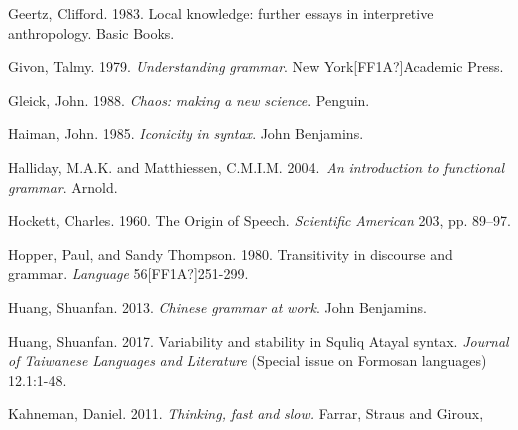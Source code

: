 \begin{stylereferences}
Geertz, Clifford. 1983. Local knowledge: further essays in interpretive anthropology. Basic Books.  ~
\end{stylereferences}

\begin{stylereferences}
Givon, Talmy. 1979. \textit{Understanding} \textit{grammar}. New York[FF1A?]Academic Press.
\end{stylereferences}

\begin{stylereferences}
Gleick, John. 1988. \textit{Chaos:} \textit{making} \textit{a} \textit{new} \textit{science}. Penguin.
\end{stylereferences}

\begin{stylereferences}
Haiman, John. 1985. \textit{Iconicity} \textit{in} \textit{syntax}. John Benjamins.
\end{stylereferences}

\begin{stylereferences}
Halliday, M.A.K. and Matthiessen, C.M.I.M. 2004.~\textit{An} \textit{introduction} \textit{to} \textit{functional} \textit{grammar}.  Arnold.
\end{stylereferences}

\begin{stylereferences}
Hockett, Charles. 1960. The Origin of Speech. \textit{Scientific} \textit{American} 203, pp. 89–97.
\end{stylereferences}

\begin{stylereferences}
Hopper, Paul, and Sandy Thompson. 1980. Transitivity in discourse and grammar. \textit{Language} 56[FF1A?]251-299.
\end{stylereferences}

\begin{stylereferences}
Huang, Shuanfan. 2013. \textit{Chinese} \textit{grammar} \textit{at} \textit{work}. John Benjamins.
\end{stylereferences}

\begin{stylereferences}
Huang, Shuanfan. 2017. Variability and stability in Squliq Atayal syntax. \textit{Journal} \textit{of} \textit{Taiwanese} \textit{Languages} \textit{and} \textit{Literature} (Special issue on Formosan languages) 12.1:1-48.
\end{stylereferences}

\begin{stylereferences}
Kahneman, Daniel. 2011. \textit{Thinking,} \textit{fast} \textit{and} \textit{slow.} Farrar, Straus and Giroux, 
\end{stylereferences}

